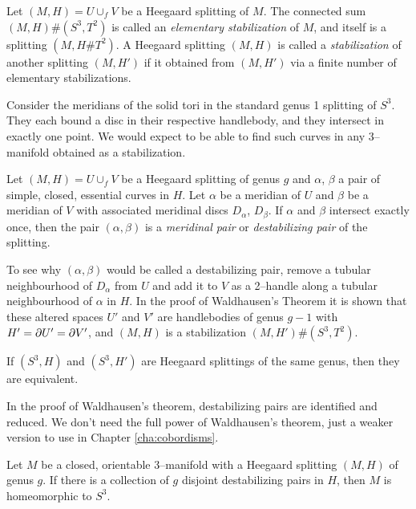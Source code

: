 \begin{defn}
	Let $(M,H)=U\cup_f V$ be a Heegaard splitting of $M$.
	The connected sum $(M,H)\#(S^3,T^2)$ is called an \emph{elementary stabilization} of $M$, and itself is a splitting $(M,H\#T^2)$.
	A Heegaard splitting $(M,H)$ is called a \emph{stabilization} of another splitting $(M,H')$ if it obtained from $(M,H')$ via a finite number of elementary stabilizations.
\end{defn}

Consider the meridians of the solid tori in the standard genus 1 splitting of $S^3$.
They each bound a disc in their respective handlebody, and they intersect in exactly one point.
We would expect to be able to find such curves in any 3--manifold obtained as a stabilization.
	
\begin{defn}	
	Let $(M,H)=U\cup_f V$ be a Heegaard splitting of genus $g$ and $\alpha$, $\beta$ a pair of simple, closed, essential curves in $H$.
	Let $\alpha$ be a meridian of $U$ and $\beta$ be a meridian of $V$ with associated meridinal discs $D_\alpha$, $D_\beta$.
	If $\alpha$ and $\beta$ intersect exactly once, then the pair $(\alpha,\beta)$ is a \emph{meridinal pair} or \emph{destabilizing pair} of the splitting.
\end{defn}

To see why $(\alpha,\beta)$ would be called a destabilizing pair, remove a tubular neighbourhood of $D_\alpha$ from $U$ and add it to $V$ as a 2--handle along a tubular neighbourhood of $\alpha$ in $H$.
In the proof of Waldhausen's Theorem it is shown that these altered spaces $U'$ and $V'$ are handlebodies of genus $g-1$ with $H'= \partial U' = \partial V'$, and $(M,H)$ is a stabilization $(M,H')\#(S^3,T^2)$.

\begin{theorem}
	If $(S^3,H)$ and $(S^3,H')$ are Heegaard splittings of the same genus, then they are equivalent.
\end{theorem}

In the proof of Waldhausen's theorem, destabilizing pairs are identified and reduced.
We don't need the full power of Waldhausen's theorem, just a weaker version to use in Chapter \ref{cha:cobordisms}.

\begin{theorem}
	\label{thm:lilwald}
	Let $M$ be a closed, orientable 3--manifold with a Heegaard splitting $(M,H)$ of genus $g$.
	If there is a collection of $g$ disjoint destabilizing pairs in $H$, then $M$ is homeomorphic to $S^3$.
\end{theorem}

